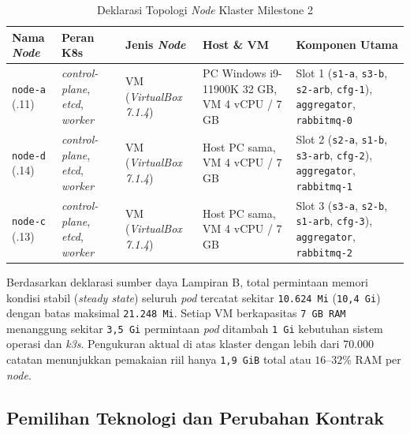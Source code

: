\begin{table}[H]
  \centering
  \caption{Deklarasi Topologi \textit{Node} Klaster Milestone 2}
  \label{tab:topo-decl}
  \small
  \begin{tabularx}{\linewidth}{@{} >{\raggedright\arraybackslash}p{1.8cm} >{\raggedright\arraybackslash}p{2.9cm} >{\raggedright\arraybackslash}p{2.5cm} >{\raggedright\arraybackslash}p{3.0cm} >{\raggedright\arraybackslash}X @{}}
    \toprule
    \textbf{Nama \textit{Node}} & \textbf{Peran K8s} & \textbf{Jenis \textit{Node}} & \textbf{Host \& VM} & \textbf{Komponen Utama} \\
    \midrule
    \texttt{node-a} (.11) & \textit{control-plane}, \textit{etcd}, \textit{worker} & VM (\textit{VirtualBox 7.1.4}) & PC Windows i9-11900K 32 GB, VM 4 vCPU / 7 GB & Slot 1 (\texttt{s1-a}, \texttt{s3-b}, \texttt{s2-arb}, \texttt{cfg-1}), \texttt{aggregator}, \texttt{rabbitmq-0} \\
    \midrule
    \texttt{node-d} (.14) & \textit{control-plane}, \textit{etcd}, \textit{worker} & VM (\textit{VirtualBox 7.1.4}) & Host PC sama, VM 4 vCPU / 7 GB & Slot 2 (\texttt{s2-a}, \texttt{s1-b}, \texttt{s3-arb}, \texttt{cfg-2}), \texttt{aggregator}, \texttt{rabbitmq-1} \\
    \midrule
    \texttt{node-c} (.13) & \textit{control-plane}, \textit{etcd}, \textit{worker} & VM (\textit{VirtualBox 7.1.4}) & Host PC sama, VM 4 vCPU / 7 GB & Slot 3 (\texttt{s3-a}, \texttt{s2-b}, \texttt{s1-arb}, \texttt{cfg-3}), \texttt{aggregator}, \texttt{rabbitmq-2} \\
    \bottomrule
  \end{tabularx}
\end{table}

Berdasarkan deklarasi sumber daya Lampiran B, total permintaan memori kondisi stabil (\textit{steady state}) seluruh \textit{pod} tercatat sekitar \texttt{10.624 Mi} (\texttt{10,4 Gi}) dengan batas maksimal \texttt{21.248 Mi}. Setiap VM berkapasitas \texttt{7 GB RAM} menanggung sekitar \texttt{3,5 Gi} permintaan \textit{pod} ditambah \texttt{1 Gi} kebutuhan sistem operasi dan \textit{k3s}. Pengukuran aktual di atas klaster dengan lebih dari 70.000 catatan menunjukkan pemakaian riil hanya \texttt{1,9 GiB} total atau $16$--$32\%$ RAM per \textit{node}.

\subsection{Pemilihan Teknologi dan Perubahan Kontrak}

